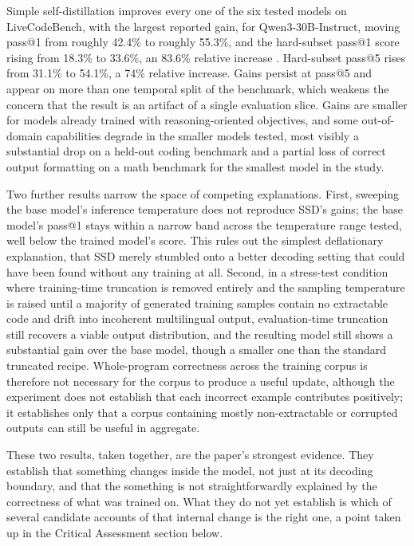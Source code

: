 \documentclass[11pt]{article}
\begin{document}
Simple self-distillation improves every one of the six tested models on LiveCodeBench, with the largest reported gain, for Qwen3-30B-Instruct, moving pass@1 from roughly 42.4\% to roughly 55.3\%, and the hard-subset pass@1 score rising from 18.3\% to 33.6\%, an 83.6\% relative increase \cite{zhang2026ssd}. Hard-subset pass@5 rises from 31.1\% to 54.1\%, a 74\% relative increase. Gains persist at pass@5 and appear on more than one temporal split of the benchmark, which weakens the concern that the result is an artifact of a single evaluation slice. Gains are smaller for models already trained with reasoning-oriented objectives, and some out-of-domain capabilities degrade in the smaller models tested, most visibly a substantial drop on a held-out coding benchmark and a partial loss of correct output formatting on a math benchmark for the smallest model in the study.

Two further results narrow the space of competing explanations. First, sweeping the base model's inference temperature does not reproduce SSD's gains; the base model's pass@1 stays within a narrow band across the temperature range tested, well below the trained model's score. This rules out the simplest deflationary explanation, that SSD merely stumbled onto a better decoding setting that could have been found without any training at all. Second, in a stress-test condition where training-time truncation is removed entirely and the sampling temperature is raised until a majority of generated training samples contain no extractable code and drift into incoherent multilingual output, evaluation-time truncation still recovers a viable output distribution, and the resulting model still shows a substantial gain over the base model, though a smaller one than the standard truncated recipe. Whole-program correctness across the training corpus is therefore not necessary for the corpus to produce a useful update, although the experiment does not establish that each incorrect example contributes positively; it establishes only that a corpus containing mostly non-extractable or corrupted outputs can still be useful in aggregate.

These two results, taken together, are the paper's strongest evidence. They establish that something changes inside the model, not just at its decoding boundary, and that the something is not straightforwardly explained by the correctness of what was trained on. What they do not yet establish is which of several candidate accounts of that internal change is the right one, a point taken up in the Critical Assessment section below.
\end{document}
